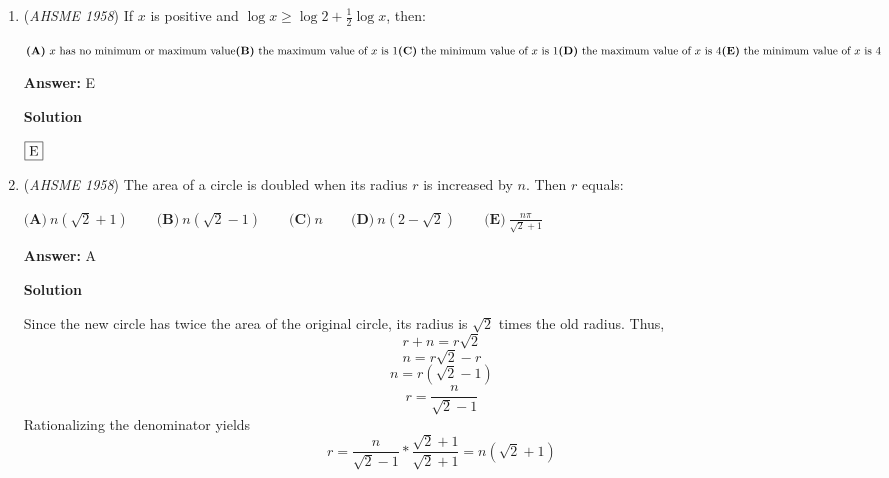 \begin{enumerate}
We can split the hexagon into 6 equilateral triangles. If the area of the circle is $100pi$, then the radius is $10$. The radius is equal to the height of one of the equilateral triangles. Using $sin60 = \frac{\sqrt3}{2}$, we get the hypotenuse is $\frac{20\sqrt{3}}{3}$, which is also equal to the side length. Using the hexagon formula (or going back to the equilateral triangle formula $\cdot 6$), we get 

 $\frac{6}{4} \cdot s^2\sqrt{3} \Rightarrow$ $\frac{6}{4} \cdot (\frac{20\sqrt3}{3})^2 \cdot \sqrt3 \Rightarrow$ $\frac{6}{4} \cdot \frac{20\sqrt3}{3} \cdot \frac{20\sqrt3}{3} \cdot \sqrt3 \Rightarrow$ $\boxed{200\sqrt3}$



	\item (\textit{AHSME 1958}) If $x$ is positive and $\log{x} \ge \log{2} + \frac{1}{2}\log{x}$, then:


 $\textbf{(A)}\ {x}\text{ has no minimum or maximum value}\qquad \\ \textbf{(B)}\ \text{the maximum value of }{x}\text{ is }{1}\qquad \\ \textbf{(C)}\ \text{the minimum value of }{x}\text{ is }{1}\qquad \\ \textbf{(D)}\ \text{the maximum value of }{x}\text{ is }{4}\qquad \\ \textbf{(E)}\ \text{the minimum value of }{x}\text{ is }{4}$

 \textbf{Answer: }E



\textbf{Solution}

$\fbox{E}$



	\item (\textit{AHSME 1958}) The area of a circle is doubled when its radius $r$ is increased by $n$. Then $r$ equals:


 $\textbf{(A)}\ n(\sqrt{2} + 1)\qquad  \textbf{(B)}\ n(\sqrt{2} - 1)\qquad  \textbf{(C)}\ n\qquad  \textbf{(D)}\ n(2 - \sqrt{2})\qquad  \textbf{(E)}\ \frac{n\pi}{\sqrt{2} + 1}$

 \textbf{Answer: }A



\textbf{Solution}

Since the new circle has twice the area of the original circle, its radius is $\sqrt{2}$ times the old radius. Thus, 
 \[r + n = r\sqrt{2}\]
 \[n = r\sqrt{2} - r\]
 \[n = r(\sqrt{2} - 1)\]
 \[r = \frac{n}{\sqrt{2} - 1}\]Rationalizing the denominator yields
 \[r = \frac{n}{\sqrt{2} - 1} *  \frac{\sqrt{2} + 1}{\sqrt{2} + 1} = n(\sqrt{2} + 1)\]


\end{enumerate}
